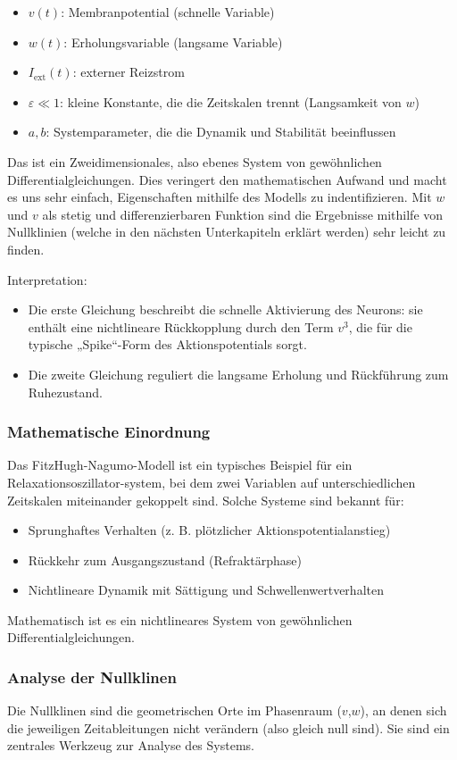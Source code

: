 \begin{refsection}
\begin{itemize}
	\item $v(t)$: Membranpotential (schnelle Variable)
	\item $w(t)$: Erholungsvariable (langsame Variable)
	\item $I_{\text{ext}}(t)$: externer Reizstrom
	\item $\varepsilon \ll 1$: kleine Konstante, die die Zeitskalen trennt (Langsamkeit von $w$)
	\item $a, b$: Systemparameter, die die Dynamik und Stabilität beeinflussen
\end{itemize}
Das ist ein Zweidimensionales, also ebenes System von gewöhnlichen Differentialgleichungen. Dies veringert den mathematischen Aufwand und macht es uns sehr einfach, Eigenschaften mithilfe des Modells zu indentifizieren.
Mit $w$ und $v$ als stetig und differenzierbaren Funktion sind die Ergebnisse mithilfe von Nullklinien (welche in den nächsten Unterkapiteln erklärt werden) sehr leicht zu finden.

Interpretation:
\begin{itemize}
    \item Die erste Gleichung beschreibt die schnelle Aktivierung des Neurons: sie enthält eine nichtlineare Rückkopplung durch den Term $v^3$, die für die typische „Spike“-Form des Aktionspotentials sorgt.
    \item Die zweite Gleichung reguliert die langsame Erholung und Rückführung zum Ruhezustand.
\end{itemize}
\cite{nerven:InaLammers.31.08.2015}
\subsubsection{Mathematische Einordnung}
Das FitzHugh-Nagumo-Modell ist ein typisches Beispiel für ein Relaxationsoszillator-system, bei dem zwei Variablen auf unterschiedlichen Zeitskalen miteinander gekoppelt sind. Solche Systeme sind bekannt für:
\begin{itemize}
	\item Sprunghaftes Verhalten (z. B. plötzlicher Aktionspotentialanstieg)
	\item Rückkehr zum Ausgangszustand (Refraktärphase)
	\item Nichtlineare Dynamik mit Sättigung und Schwellenwertverhalten
\end{itemize}
Mathematisch ist es ein nichtlineares System von gewöhnlichen Differentialgleichungen.
\cite{nerven:InaLammers.31.08.2015}
\subsubsection{Analyse der Nullklinen}
Die Nullklinen sind die geometrischen Orte im Phasenraum ($v$,$w$), an denen sich die jeweiligen Zeitableitungen nicht verändern (also gleich null sind). Sie sind ein zentrales Werkzeug zur Analyse des Systems.


\end{refsection}
